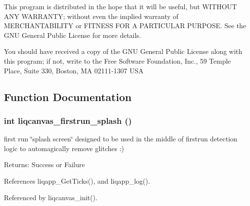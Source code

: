 This program is distributed in the hope that it will be useful, but WITHOUT ANY WARRANTY; without even the implied warranty of MERCHANTABILITY or FITNESS FOR A PARTICULAR PURPOSE. See the GNU General Public License for more details.

You should have received a copy of the GNU General Public License along with this program; if not, write to the Free Software Foundation, Inc., 59 Temple Place, Suite 330, Boston, MA 02111-1307 USA 

\subsection{Function Documentation}
\subsubsection[{liqcanvas\_\-firstrun\_\-splash}]{\setlength{\rightskip}{0pt plus 5cm}int liqcanvas\_\-firstrun\_\-splash ()}\label{d3/dcb/liqcanvas__firstrun__splash_8c_28541ca509c0f3205eb7e170afabd2d8}


first run \char`\"{}splash screen\char`\"{} designed to be used in the middle of firstrun detection logic to automagically remove glitches :) \begin{Desc}
\item[Returns:]Success or Failure \end{Desc}


References liqapp\_\-GetTicks(), and liqapp\_\-log().

Referenced by liqcanvas\_\-init().